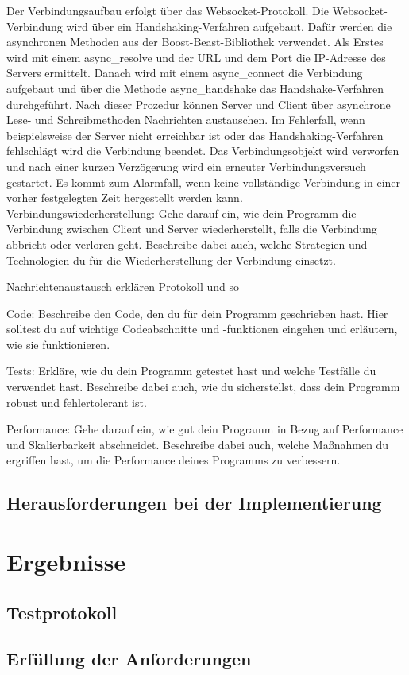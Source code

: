 \documentclass[thesis.tex]{subfiles}
\begin{document}
Der Verbindungsaufbau erfolgt über das Websocket-Protokoll.
Die Websocket-Verbindung wird über ein Handshaking-Verfahren aufgebaut.
Dafür werden die asynchronen Methoden aus der Boost-Beast-Bibliothek verwendet.
Als Erstes wird mit einem \glqq async_resolve\grqq{} und der URL und dem Port die IP-Adresse des Servers ermittelt.
Danach wird mit einem \glqq async_connect\grqq{} die Verbindung aufgebaut und über die Methode \glqq async_handshake\grqq{} das Handshake-Verfahren durchgeführt.
Nach dieser Prozedur können Server und Client über asynchrone Lese- und Schreibmethoden Nachrichten austauschen.
Im Fehlerfall, wenn beispielsweise der Server nicht erreichbar ist oder das Handshaking-Verfahren fehlschlägt wird die Verbindung beendet.
Das Verbindungsobjekt wird verworfen und nach einer kurzen Verzögerung wird ein erneuter Verbindungsversuch gestartet.
Es kommt zum Alarmfall, wenn keine vollständige Verbindung in einer vorher festgelegten Zeit hergestellt werden kann.
\\

Verbindungswiederherstellung: Gehe darauf ein, wie dein Programm die Verbindung zwischen Client und Server wiederherstellt, falls die Verbindung abbricht oder verloren geht. Beschreibe dabei auch, welche Strategien und Technologien du für die Wiederherstellung der Verbindung einsetzt.

Nachrichtenaustausch erklären Protokoll und so

Code: Beschreibe den Code, den du für dein Programm geschrieben hast. Hier solltest du auf wichtige Codeabschnitte und -funktionen eingehen und erläutern, wie sie funktionieren.

Tests: Erkläre, wie du dein Programm getestet hast und welche Testfälle du verwendet hast. Beschreibe dabei auch, wie du sicherstellst, dass dein Programm robust und fehlertolerant ist.

Performance: Gehe darauf ein, wie gut dein Programm in Bezug auf Performance und Skalierbarkeit abschneidet. Beschreibe dabei auch, welche Maßnahmen du ergriffen hast, um die Performance deines Programms zu verbessern.



\subsection{Herausforderungen bei der Implementierung}
\section{Ergebnisse}
\subsection{Testprotokoll}
\subsection{Erfüllung der Anforderungen}

\subfilebib %
\end{document}

